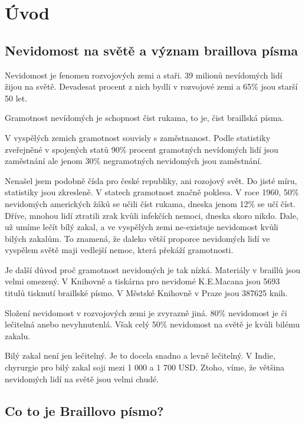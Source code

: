 
\chapter{Úvod}

\section{Nevidomost na světě a význam braillova písma}

Nevidomost je fenomen rozvojových zemi a staři. 39 milionů nevídomých lidí žijou na světě. Devadesat procent z nich bydli v rozvojové zemi a 65\% jsou starší 50 let\citep{whodata}.

Gramotnost nevídomých je schopnost čist rukama, to je, čist braillská písma.

V vyspělých zemich gramotnost souvisly s zaměstnanost. Podle statistiky zveřejněné v spojených statů 90\% procent gramotných nevídomých lidí jsou zaměstnání ale jenom 30\% negramotných nevidomých jsou zaměstnání.

Nenašel jsem podobně čísla pro české republiky, ani rozojový svět.  Do jisté míru, statistiky jsou zkresleně.  V statech gramotnost značně poklesa.  V roce 1960, 50\% nevidomých amerických žáků se učili číst rukama, dneska jenom 12\% se učí číst.  Dříve, mnohou lidí ztratili zrak kvůli infekčích nemoci, dneska skoro nikdo. Dale, už umíme lečít bílý zakal, a ve vyspělých zemi ne-existuje nevidomost kvůli bilých zakalům.  To znamená, že daleko větší proporce nevidomých lidí ve vyspělem světě maji vedlejší nemoc, která překáží gramotnosti\citep{perkins,whozakal,whodata}.

Je další důvod proč gramotnost nevidomých je tak nízká.  Materiály v braillů jsou velmi omezený.  V Knihovně a tiskárna pro nevidomé K.E.Macana jsou 5693 titulů tisknutí braillské písmo\citep{biblio}. V Městské Knihovně v Praze jsou 387625 knih\citep{mlp}.

Složení nevidomost v rozvojových zemi je zvyrazně jiná. 80\% nevidomost je či lečitelná anebo nevyhnutenlá\citep{whodata}.  Však celý 50\% nevidomost na světě je kvůli bilému zakalu\citep{whozakal}.

Bilý zakal není jen lečitelný. Je to docela snadno a levně lečitelný. V Indie, chyrurgie pro bilý zakal soji mezi 1 000 a 1 700 USD\citep{cataractsindia}. Ztoho, víme, že většina nevidomých lidí na světě jsou velmi chudé.

\section{Co to je Braillovo písmo?}

